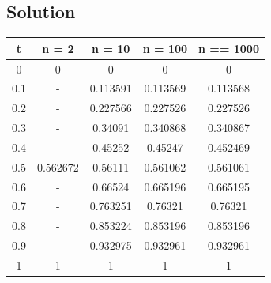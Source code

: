 \documentclass[12pt]{article}
\begin{document}
    \subsection{Solution}
    \begin{center}
        \begin{tabular}{|c|c|c|c|c|}
            \hline
            t & n = 2 & n = 10 & n = 100 & n == 1000\\
            \hline
            0 & 0 & 0 & 0 & 0 \\
            \hline
            0.1 & - & 0.113591 & 0.113569 & 0.113568\\
            \hline
            0.2 & - & 0.227566 & 0.227526 & 0.227526\\
            \hline
            0.3 & - & 0.34091 & 0.340868 & 0.340867\\
            \hline
            0.4 & - & 0.45252 & 0.45247 & 0.452469\\
            \hline
            0.5 & 0.562672 & 0.56111 & 0.561062 & 0.561061\\
            \hline
            0.6 & - & 0.66524 & 0.665196 & 0.665195\\
            \hline
            0.7 & - & 0.763251 & 0.76321 & 0.76321\\
            \hline
            0.8 & - & 0.853224 & 0.853196 & 0.853196\\
            \hline
            0.9 & - & 0.932975 & 0.932961 & 0.932961\\
            \hline
            1 & 1 & 1 & 1 & 1\\
            \hline
        \end{tabular}
    \end{center}
\end{document}
